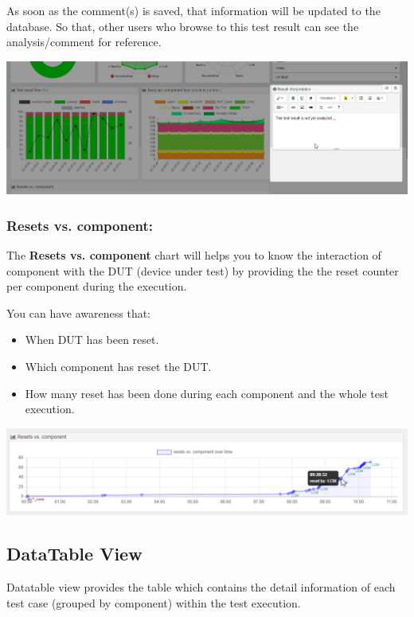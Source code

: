 As soon as the comment(s) is saved, that information will be updated to 
the database. So that, other users who browse to this test result can see
the analysis/comment for reference.

\includegraphics[width=1\linewidth]
{./pictures/dashboard/result_interpretation.png}

\subsubsection{Resets vs. component:}

The \textbf{Resets vs. component} chart will helps you to know the interaction
of component with the DUT (device under test) by providing the the reset counter
per component during the execution.

You can have awareness that:
\begin{itemize}
   \item When DUT has been reset.
   \item Which component has reset the DUT.
   \item How many reset has been done during each component and the whole
         test execution.
\end{itemize}

\includegraphics[width=1\linewidth]
{./pictures/dashboard/reset_vs_component.png}

\hypertarget{datatable-view}{%
\subsection{DataTable View}\label{datatable-view}}

Datatable view provides the table which contains the detail information of each
test case (grouped by component) within the test execution.

